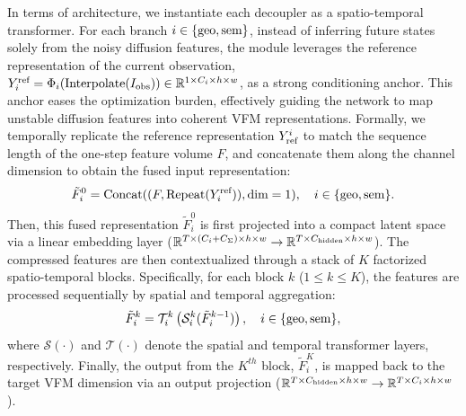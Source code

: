 In terms of architecture, we instantiate each decoupler as a spatio-temporal transformer. For each branch $i \in \{\textnormal{geo}, \textnormal{sem}\}$, instead of inferring future states solely from the noisy diffusion features, the module leverages the reference representation of the current observation, $Y_{i}^{\textnormal{ref}} = \Phi_{i}(\textnormal{Interpolate}(I_\textnormal{obs}))\in\mathbb{R}^{1\times{C_i}\times h \times w}$, as a strong conditioning anchor. This anchor eases the optimization burden, effectively guiding the network to map unstable diffusion features into coherent VFM representations.
Formally, we temporally replicate the reference representation $Y_{\textnormal{ref}}^{i}$ to match the sequence length of the one-step feature volume $F$, and concatenate them along the channel dimension to obtain the fused input representation:
\begin{equation}
    \tilde{F}_i^0 = \text{Concat}((F, \text{Repeat}(Y_{i}^{\textnormal{ref}})), \text{dim}=1), \quad i \in \{\textnormal{geo}, \textnormal{sem}\}. 
\end{equation}
Then, this fused representation $\tilde{F}_i^0$ is first projected into a compact latent space via a linear embedding layer ($\mathbb{R}^{T\times (C_{i}+C_{\Sigma}) \times h \times w} \rightarrow \mathbb{R}^{T\times C_\textnormal{hidden} \times h \times w}$). The compressed features are then contextualized through a stack of $K$ factorized spatio-temporal blocks. Specifically, for each block $k$ ($1 \le k \le K$), the features are processed sequentially by spatial and temporal aggregation:
\begin{equation}
    \tilde{F}_i^k = \mathcal{T}_i^k \left( \mathcal{S}_i^k ( \tilde{F}_i^{k-1} ) \right), \quad i \in \{\textnormal{geo}, \textnormal{sem}\},
\end{equation}
where $\mathcal{S}(\cdot)$ and $\mathcal{T}(\cdot)$ denote the spatial and temporal transformer layers, respectively. Finally, the output from the $K^{th}$ block, $\tilde{F}_i^K$, is mapped back to the target VFM dimension via an output projection ($\mathbb{R}^{T\times C_\textnormal{hidden} \times h \times w} \rightarrow \mathbb{R}^{T\times C_i \times h \times w}$).

